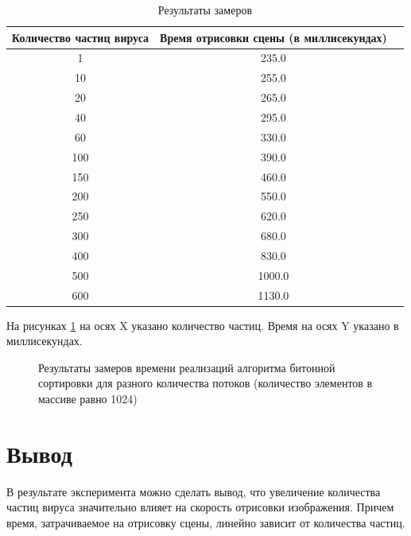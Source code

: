 \begin{table}[h]
	\begin{center}
		\begin{threeparttable}
			\captionsetup{justification=raggedright,singlelinecheck=off}
			\caption{\label{tbl:timings} Результаты замеров}
			\begin{tabular}{|c|c|c|}
				\hline
				Количество частиц вируса& Время отрисовки сцены (в миллисекундах) \\  \hline
				1 & 235.0 \\ \hline 
				10 & 255.0 \\ \hline 
				20 & 265.0 \\ \hline 
				40 & 295.0 \\ \hline 
				60 & 330.0 \\ \hline 
				100 & 390.0 \\ \hline 
				150 & 460.0 \\ \hline 
				200 & 550.0 \\ \hline 
				250 & 620.0 \\ \hline 
				300 & 680.0 \\ \hline 
				400 & 830.0 \\ \hline 
				500 & 1000.0 \\ \hline 
				600 & 1130.0 \\ \hline 
			\end{tabular}
		\end{threeparttable}
	\end{center}
	
\end{table}

На рисунках \ref{fig:timings} на осях X указано количество частиц. Время на осях Y указано в миллисекундах.

\begin{figure}[ph!]
	\caption{Результаты замеров времени реализаций алгоритма битонной сортировки для разного количества потоков (количество элементов в массиве равно 1024)}
	\label{fig:timings}
\end{figure}


\section*{Вывод}

В результате эксперимента можно сделать вывод, что увеличение количества частиц вируса значительно влияет на скорость отрисовки изображения. Причем время, затрачиваемое на отрисовку сцены, линейно зависит от количества частиц.



